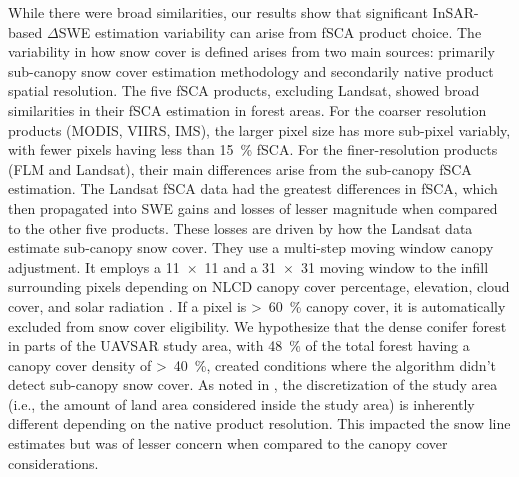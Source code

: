While there were broad similarities, our results show that significant InSAR-based $\Delta$SWE estimation variability can arise from fSCA product choice. The variability in how snow cover is defined arises from two main sources: primarily sub-canopy snow cover estimation methodology and secondarily native product spatial resolution. The five fSCA products, excluding Landsat, showed broad similarities in their fSCA estimation in forest areas. For the coarser resolution products (MODIS, VIIRS, IMS), the larger pixel size has more sub-pixel variably, with fewer pixels having less than 15~\% fSCA. For the finer-resolution products (FLM and Landsat), their main differences arise from the sub-canopy fSCA estimation. The Landsat fSCA data had the greatest differences in fSCA, which then propagated into SWE gains and losses of lesser magnitude when compared to the other five products. These losses are driven by how the Landsat data estimate sub-canopy snow cover. They use a multi-step moving window canopy adjustment. It employs a 11~$\times$~11 and a 31~$\times$~31 moving window to the infill surrounding pixels depending on NLCD canopy cover percentage, elevation, cloud cover, and solar radiation \citep{selkowitzUSGSLandsatSnow2017}. If a pixel is >~60~\% canopy cover, it is automatically excluded from snow cover eligibility. We hypothesize that the dense conifer forest in parts of the UAVSAR study area, with 48~\% of the total forest having a canopy cover density of >~40~\%, created conditions where the algorithm didn't detect sub-canopy snow cover. As noted in \cite{bairHowTradeoffsSatellite2023}, the discretization of the study area (i.e., the amount of land area considered inside the study area) is inherently different depending on the native product resolution. This impacted the snow line estimates but was of lesser concern when compared to the canopy cover considerations.

